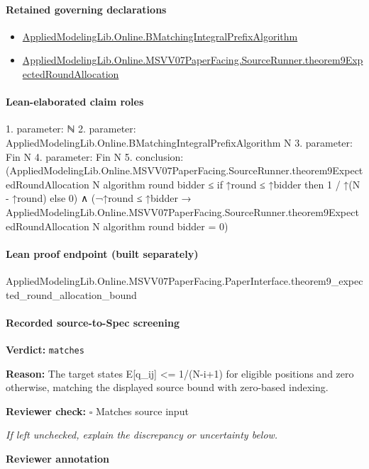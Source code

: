 \documentclass[10pt]{article}
\newcommand{\reviewerbox}{%
  \par\noindent\fbox{\parbox{0.96\linewidth}{\rule{0pt}{0.38in}}}\par
}
\newcommand{\reviewmatch}[1]{%
  \par\noindent\textbf{Reviewer check:} $\square$\; #1\par
  \noindent\emph{If left unchecked, explain the discrepancy or uncertainty below.}\par
}
\begin{document}
\paragraph{Retained governing declarations}
\begin{itemize}\raggedright
\item \hyperlink{governing-declaration-736ec20594878fea}{Applied\allowbreak{}Modeling\allowbreak{}Lib.\allowbreak{}Online.\allowbreak{}B\allowbreak{}Matching\allowbreak{}Integral\allowbreak{}Prefix\allowbreak{}Algorithm}
\item \hyperlink{governing-declaration-e93c3b888be1a5ee}{Applied\allowbreak{}Modeling\allowbreak{}Lib.\allowbreak{}Online.\allowbreak{}MSVV07\allowbreak{}Paper\allowbreak{}Facing.\allowbreak{}Source\allowbreak{}Runner.\allowbreak{}theorem9\allowbreak{}Expected\allowbreak{}Round\allowbreak{}Allocation}
\end{itemize}
\paragraph{Lean-elaborated claim roles}\begin{ReviewVerbatim}
1. parameter: ℕ
2. parameter: AppliedModelingLib.Online.BMatchingIntegralPrefixAlgorithm N
3. parameter: Fin N
4. parameter: Fin N
5. conclusion: (AppliedModelingLib.Online.MSVV07PaperFacing.SourceRunner.theorem9ExpectedRoundAllocation N algorithm round bidder ≤
    if ↑round ≤ ↑bidder then 1 / ↑(N - ↑round) else 0) ∧
  (¬↑round ≤ ↑bidder →
    AppliedModelingLib.Online.MSVV07PaperFacing.SourceRunner.theorem9ExpectedRoundAllocation N algorithm round bidder =
      0)
\end{ReviewVerbatim}

\paragraph{Lean proof endpoint (built separately)}\begin{ReviewVerbatim}
AppliedModelingLib.Online.MSVV07PaperFacing.PaperInterface.theorem9_expected_round_allocation_bound
\end{ReviewVerbatim}

\paragraph{Recorded source-to-Spec screening}
\textbf{Verdict:} \texttt{matches}
\\
{\raggedright
\textbf{Reason:} The target states E[q\_\allowbreak{}ij] <= 1/\allowbreak{}(N-\allowbreak{}i+1) for eligible positions and zero otherwise, matching the displayed source bound with zero-\allowbreak{}based indexing.\allowbreak{}
\par}
\reviewmatch{Matches source input}
\noindent\textbf{Reviewer annotation}\par
\reviewerbox
\clearpage
\hypertarget{source-claim-8b60e42d042bbf22}{}
\end{document}
